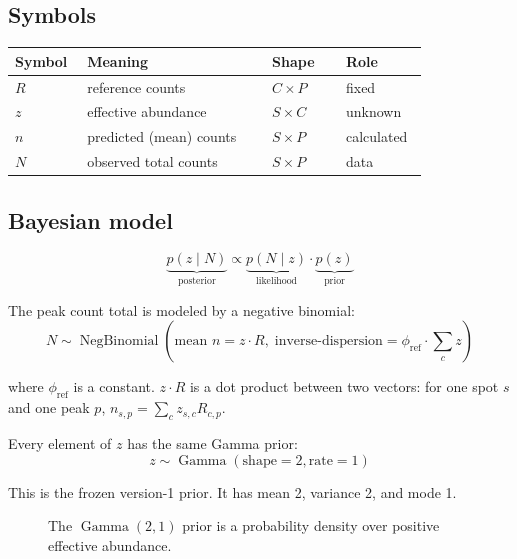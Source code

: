 \documentclass[11pt]{article}
\newcommand{\NB}{\operatorname{NegBinomial}}
\newcommand{\Gam}{\operatorname{Gamma}}
\begin{document}
\subsection{Symbols}

\begin{center}
\begin{tabular}{C{0.12\linewidth}L{0.40\linewidth}C{0.16\linewidth}L{0.14\linewidth}}
\toprule
Symbol & Meaning & Shape & Role \\
\midrule
\(R\) & reference counts & \(C\times P\) & fixed \\
\(z\) & effective abundance & \(S\times C\)  & unknown \\
\(n\) & predicted (mean) counts & \(S\times P\)  & calculated \\
\(N\) & observed total counts & \(S\times P\)  & data \\
\bottomrule
\end{tabular}
\end{center}

\subsection{Bayesian model}

\[
\underbrace{p(z\mid N)}_{\text{posterior}}
\propto
\underbrace{p(N \mid z)}_{\text{likelihood}} \cdot
\underbrace{p(z)}_{\text{prior}}
\]

The peak count total is modeled by a negative binomial:
\[
\boxed{
N\sim\NB\!\left(
\text{mean } n=z \cdot R,\;
\text{inverse-dispersion}=\phi_{\mathrm{ref}} \cdot \sum_c{z}
\right)
}
\]

where $\phi_{\mathrm{ref}}$ is a constant. $z \cdot R$ is a dot product between two
vectors: for one spot $s$ and one peak $p$, $n_{s,p}=\sum_c z_{s,c}R_{c,p}$.



Every element of $z$ has the same Gamma prior:
\[
\boxed{z\sim\Gam(\text{shape}=2,\text{rate}=1)}
\]

This is the frozen version-1 prior. It has mean 2, variance 2, and mode 1.

\begin{figure}[H]
\centering
{}
\caption{The \(\Gam(2,1)\) prior is a probability density over positive effective abundance.}
\end{figure}
\end{document}
